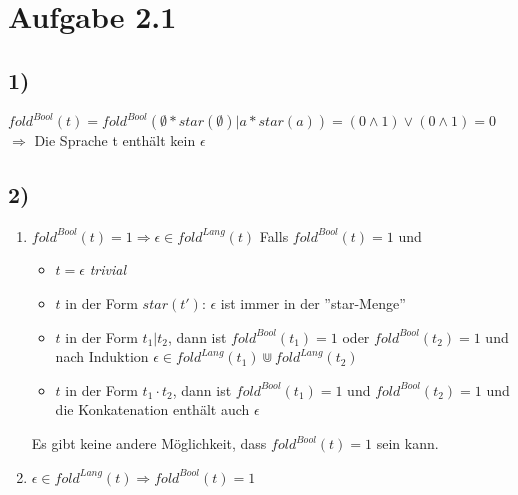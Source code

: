 \section*{Aufgabe 2.1}
\subsection*{1)}
$fold^{Bool}(t) =
fold^{Bool}(\emptyset * star(\emptyset) | a * star(a)) = 
(0 \wedge 1) \vee (0 \wedge 1) = 0$ \\
$\Rightarrow$ Die Sprache t enthält kein $\epsilon$
\subsection*{2)}
\begin{enumerate}
    \item $fold^{Bool}(t)=1\Rightarrow\epsilon\in fold^{Lang}(t)$
    Falls $fold^{Bool}(t)=1$ und
    \begin{itemize}
        \item $t=\epsilon$ \textit{trivial}
        \item $t$ in der Form $star(t')$: $\epsilon$ ist immer in der ''star-Menge''
        \item $t$ in der Form $t_1 | t_2$, dann ist 
        $fold^{Bool}(t_1)=1$ oder $fold^{Bool}(t_2)=1$ und nach Induktion $\epsilon\in fold^{Lang}(t_1)\Cup fold^{Lang}(t_2)$
        \item $t$ in der Form $t_1 \cdot t_2$, dann ist $fold^{Bool}(t_1)=1$ und $fold^{Bool}(t_2)=1$ und die Konkatenation enthält auch $\epsilon$
    \end{itemize}
    Es gibt keine andere Möglichkeit, dass $fold^{Bool}(t)=1$ sein kann.
    \item $\epsilon\in fold^{Lang}(t) \Rightarrow fold^{Bool}(t)=1$
    
\end{enumerate}
